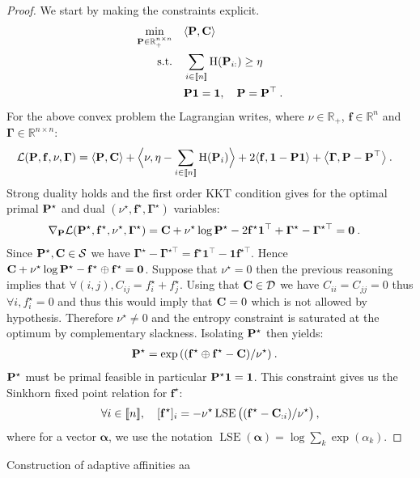\begin{proof}
We start by making the constraints explicit.
\begin{align}
    \min_{\mathbf{P} \in \mathbb{R}_+^{n \times n}} \quad &\langle \mathbf{P}, \mathbf{C} \rangle \\
    \text{s.t.} \quad &\sum_{i \in {[\![n]\!]}} \operatorname{H}(\mathbf{P}_{i:}) \geq \eta \\
    & \mathbf{P} \bm{1} = \bm{1}, \quad \mathbf{P} = \mathbf{P}^\top \:.
\end{align}
For the above convex problem the Lagrangian writes, where $\nu \in \mathbb{R}_+$, $\mathbf{f} \in \mathbb{R}^n$ and $\bm{\Gamma} \in \mathbb{R}^{n \times n}$:
\begin{align}
    \mathcal{L}(\mathbf{P}, \mathbf{f}, \nu, \bm{\Gamma}) &= \langle \mathbf{P}, \mathbf{C} \rangle + \Big\langle \nu, \eta - \sum_{i \in {[\![n]\!]}} \operatorname{H}(\mathbf{P}_i) \Big\rangle + 2\langle \mathbf{f}, \bm{1} - \mathbf{P} \bm{1} \rangle + \big\langle \bm{\Gamma}, \mathbf{P} - \mathbf{P}^\top \big\rangle \:.
\end{align}
Strong duality holds and the first order KKT condition gives for the optimal primal $\mathbf{P}^\star$ and dual $(\nu^\star, \mathbf{f}^\star, \bm{\Gamma}^\star)$ variables: 
\begin{align}
    \nabla_{\mathbf{P}} \mathcal{L}(\mathbf{P}^\star, \mathbf{f}^\star, \nu^\star, \bm{\Gamma}^\star) &= \mathbf{C} + \nu^\star \log{\mathbf{P}^\star} - 2\mathbf{f}^\star \bm{1}^\top + \bm{\Gamma}^\star - \bm{\Gamma}^{\star\top} = \bm{0} \:.
\end{align}
Since $\mathbf{P}^\star, \mathbf{C} \in \mathcal{S}$ we have $\bm{\Gamma}^\star - \bm{\Gamma}^{\star\top} = \mathbf{f}^\star \bm{1}^\top - \bm{1}\mathbf{f}^{\star \top}$. Hence $\mathbf{C} + \nu^\star \log{\mathbf{P}^\star} - \mathbf{f}^\star \oplus \mathbf{f}^\star = \bm{0}$. Suppose that $\nu^\star = 0$ then the previous reasoning implies that $\forall (i,j), C_{ij} = f_i^\star + f_j^\star$. Using that $\mathbf{C} \in \mathcal{D}$ we have $C_{ii} = C_{jj} = 0$ thus $\forall i,  f^\star_i = 0$ and thus this would imply that $\mathbf{C} = 0$ which is not allowed by hypothesis. Therefore $\nu^\star \neq 0$ and the entropy constraint is saturated at the optimum by complementary slackness. Isolating $\mathbf{P}^\star$ then yields:
\begin{align}
    \mathbf{P}^{\star} &= \exp{\left( (\mathbf{f}^\star \oplus \mathbf{f}^{\star} - \mathbf{C}) / \nu^\star \right)} \:.
\end{align}
$\mathbf{P}^\star$ must be primal feasible in particular $\mathbf{P}^\star \bm{1} = \bm{1}$. This constraint gives us the Sinkhorn fixed point relation for $\mathbf{f}^\star$:
\begin{align}
    \forall i \in {[\![n]\!]}, \quad [\mathbf{f}^\star]_i = - \nu^\star \operatorname{LSE} \big((\mathbf{f}^\star - \mathbf{C}_{:i}) / \nu^\star \big)\,,
\end{align}
where for a vector $\bm{\alpha}$, we use the notation
$\operatorname{LSE}(\bm{\alpha}) = \log \sum_{k} \exp (\alpha_k)$.
\end{proof}

\vspace{0.5cm}
\begin{prob}{Construction of adaptive affinities}
    aa
\end{prob}
\vspace{0.5cm}
